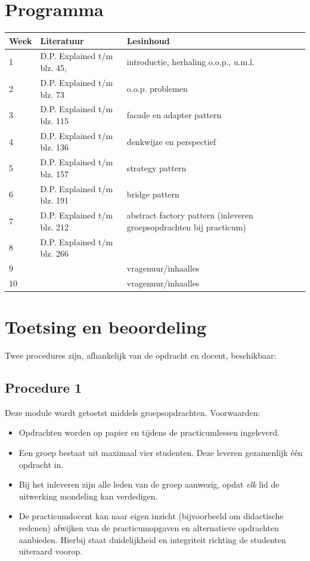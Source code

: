 \documentclass[titlepage,a4paper, 11pt]{article}
\begin{document}
\section{Programma}

\begin{tabular}{|p{1cm}|p{4cm}|p{4cm}|}
\hline
Week&Literatuur&Lesinhoud\\
\hline
1&D.P. Explained t/m blz. 45,&introductie, herhaling o.o.p., u.m.l.\\
\hline
2&D.P. Explained t/m blz. 73&o.o.p. problemen\\
\hline
3&D.P. Explained t/m blz. 115&facade en adapter pattern\\
\hline
4&D.P. Explained t/m blz. 136&denkwijze en perspectief\\
\hline
5&D.P. Explained t/m blz. 157&strategy pattern\\
\hline
6&D.P. Explained t/m blz. 191&bridge pattern\\
\hline
7&D.P. Explained t/m blz. 212&abstract factory pattern (inleveren groepsopdrachten bij practicum)\\
\hline
8&D.P. Explained t/m blz. 266 &\\
\hline
9&&vragenuur/inhaalles\\
\hline
10&&vragenuur/inhaalles\\
\hline
\end{tabular}
\section{Toetsing en beoordeling}
Twee procedures zijn, afhankelijk van de opdracht en docent, beschikbaar:

\subsection{Procedure 1}
Deze module wordt getoetst middels groepsopdrachten. Voorwaarden:
\begin{itemize}
\item Opdrachten worden op papier en tijdens de practicumlessen ingeleverd.
\item Een groep bestaat uit maximaal vier studenten. Deze leveren gezamenlijk \'e\'en opdracht in.
\item Bij het inleveren zijn alle leden van de groep aanwezig, opdat \emph{elk} lid de uitwerking mondeling kan verdedigen.
\item De practicumdocent kan naar eigen inzicht (bijvoorbeeld om didactische redenen) afwijken van de practicumopgaven en alternatieve opdrachten aanbieden. Hierbij staat duidelijkheid en integriteit richting de studenten uiteraard voorop.
\end{itemize}
\end{document}

